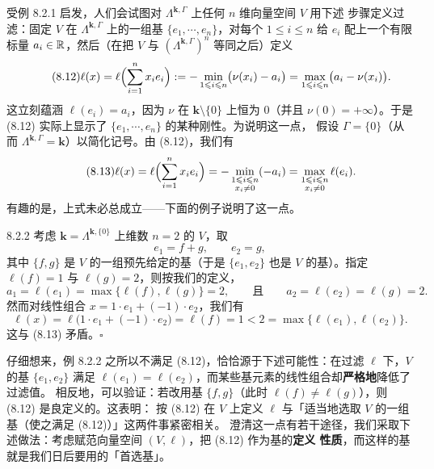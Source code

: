 受例 8.2.1 启发，人们会试图对 $\Lambda^{\mathbf{k},\Gamma}$ 上任何 $n$ 维向量空间 $V$ 用下述
步骤定义过滤：固定 $V$ 在 $\Lambda^{\mathbf{k},\Gamma}$ 上的一组基
$\{e_1,\cdots,e_n\}$，对每个 $1\leqslant i\leqslant n$ 给 $e_i$ 配上一个有限标量
$a_i\in\mathbb{R}$，然后（在把 $V$ 与 $(\Lambda^{\mathbf{k},\Gamma})^n$ 等同之后）定义
\begin{equation}\tag{8.12}
  \ell(x)=\ell\Bigl(\sum_{i=1}^n x_ie_i\Bigr)
    :=-\min_{1\leqslant i\leqslant n}\bigl(\nu(x_i)-a_i\bigr)
    =\max_{1\leqslant i\leqslant n}\bigl(a_i-\nu(x_i)\bigr).
\end{equation}
这立刻蕴涵 $\ell(e_i)=a_i$，因为 $\nu$ 在 $\mathbf{k}\setminus\{0\}$ 上恒为 $0$（并且
$\nu(0)=+\infty$）。于是 (8.12) 实际上显示了 $\{e_1,\cdots,e_n\}$ 的某种刚性。为说明这一点，
假设 $\Gamma=\{0\}$（从而 $\Lambda^{\mathbf{k},\Gamma}=\mathbf{k}$）以简化记号。由 (8.12)，我们有
\begin{equation}\tag{8.13}
  \ell(x)=\ell\Bigl(\sum_{i=1}^n x_ie_i\Bigr)
    =-\min_{\substack{1\leqslant i\leqslant n\\ x_i\ne0}}(-a_i)
    =\max_{\substack{1\leqslant i\leqslant n\\ x_i\ne0}}\ell(e_i).
\end{equation}
有趣的是，上式未必总成立——下面的例子说明了这一点。

\begin{wexam}{8.2.2}
  考虑 $\mathbf{k}=\Lambda^{\mathbf{k},\{0\}}$ 上维数 $n=2$ 的 $V$，取
  \[
    e_1=f+g,\qquad e_2=g,
  \]
  其中 $\{f,g\}$ 是 $V$ 的一组预先给定的基（于是 $\{e_1,e_2\}$ 也是 $V$ 的基）。指定
  $\ell(f)=1$ 与 $\ell(g)=2$，则按我们的定义，
  \[
    a_1=\ell(e_1)=\max\{\ell(f),\ell(g)\}=2,
    \qquad\text{且}\qquad a_2=\ell(e_2)=\ell(g)=2.
  \]
  然而对线性组合 $x=1\cdot e_1+(-1)\cdot e_2$，我们有
  \[
    \ell(x)=\ell\bigl(1\cdot e_1+(-1)\cdot e_2\bigr)=\ell(f)=1
      <2=\max\{\ell(e_1),\ell(e_2)\}.
  \]
  这与 (8.13) 矛盾。\hfill$\square$
\end{wexam}

仔细想来，例 8.2.2 之所以不满足 (8.12)，恰恰源于下述可能性：在过滤 $\ell$ 下，$V$ 的基
$\{e_1,e_2\}$ 满足 $\ell(e_1)=\ell(e_2)$，而某些基元素的线性组合却\textbf{严格地}降低了过滤值。
相反地，可以验证：若改用基 $\{f,g\}$（此时 $\ell(f)\ne\ell(g)$），则 (8.12) 是良定义的。这表明：
按 (8.12) 在 $V$ 上定义 $\ell$ 与「适当地选取 $V$ 的一组基（使之满足 (8.12)）」这两件事紧密相关。
澄清这一点有若干途径，我们采取下述做法：考虑赋范向量空间 $(V,\ell)$，把 (8.12) 作为基的\textbf{定义
性质}，而这样的基就是我们日后要用的「首选基」。

